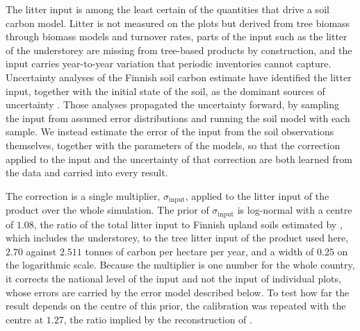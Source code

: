 \documentclass[11pt]{article}
\begin{document}
The litter input is among the least certain of the quantities that drive a soil
carbon model. Litter is not measured on the plots but derived from tree biomass
through biomass models and turnover rates, parts of the input such as the litter of
the understorey are missing from tree-based products by construction, and the input
carries year-to-year variation that periodic inventories cannot capture. Uncertainty
analyses of the Finnish soil carbon estimate have identified the litter input, together
with the initial state of the soil, as the dominant sources of uncertainty
\citep{Peltoniemi2006,LehtonenHeikkinen2015}. Those analyses propagated the
uncertainty forward, by sampling the input from assumed error distributions and running
the soil model with each sample. We instead estimate the error of the input from the
soil observations themselves, together with the parameters of the models, so that the
correction applied to the input and the uncertainty of that correction are both
learned from the data and carried into every result.

The correction is a single multiplier, $\sigma_{\mathrm{input}}$, applied to the litter
input of the product over the whole simulation. The prior of $\sigma_{\mathrm{input}}$
is log-normal with a centre of $1.08$, the ratio of the total litter input to Finnish
upland soils estimated by \citet{LehtonenHeikkinen2015}, which includes the
understorey, to the tree litter input of the product used here, $2.70$ against $2.511$
tonnes of carbon per hectare per year, and a width of $0.25$ on the logarithmic scale.
Because the multiplier is one number for the whole country, it corrects the national
level of the input and not the input of individual plots, whose errors are carried by
the error model described below. To test how far the result depends on the centre of
this prior, the calibration was repeated with the centre at $1.27$, the ratio implied
by the reconstruction of \citet{Liski2006}.
\end{document}
